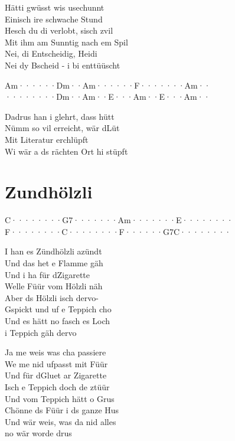 \documentclass[
  letterpaper,
  twoside=false]{scrbook}
\begin{document}
Hätti gwüsst wis usechunnt\\
Einisch ire schwache Stund\\
Hesch du di verlobt, s\textquotesingle isch zvil\\
Mit ihm am Sunntig nach em Spil\\
Nei, di Entscheidig, Heidi\\
Nei dy Bscheid - i bi enttüüscht

\textbar Am······\textbar Dm··Am··\textbar····F···\textbar····Am··\textbar{}\\
\textbar········\textbar Dm··Am··\textbar E···Am··\textbar E···Am··\textbar{}

Dadrus han i glehrt, dass hütt\\
Nümm so vil erreicht, wär d\textquotesingle Lüt\\
Mit Literatur erchlüpft\\
Wi wär a ds rächten Ort hi stüpft

\hypertarget{zundhuxf6lzli}{%
\chapter{Zundhölzli}\label{zundhuxf6lzli}}

\textbar C········\textbar G7·······\textbar Am·······\textbar E········\textbar{}\\
\textbar F········\textbar C········\textbar F······G7\textbar C········\textbar{}

I han es Zündhölzli azündt\\
Und das het e Flamme gäh\\
Und i ha für d\textquotesingle Zigarette\\
Welle Füür vom Hölzli näh\\
Aber ds Hölzli isch dervo-\\
Gspickt und uf e Teppich cho\\
Und es hätt no fasch es Loch\\
i Teppich gäh dervo

Ja me weis was cha passiere\\
We me nid ufpasst mit Füür\\
Und für d\textquotesingle Gluet ar Zigarette\\
Isch e Teppich doch de z\textquotesingle tüür\\
Und vom Teppich hätt o Grus\\
Chönne ds Füür i ds ganze Hus\\
Und wär weis, was da nid alles\\
no wär worde drus
\end{document}
